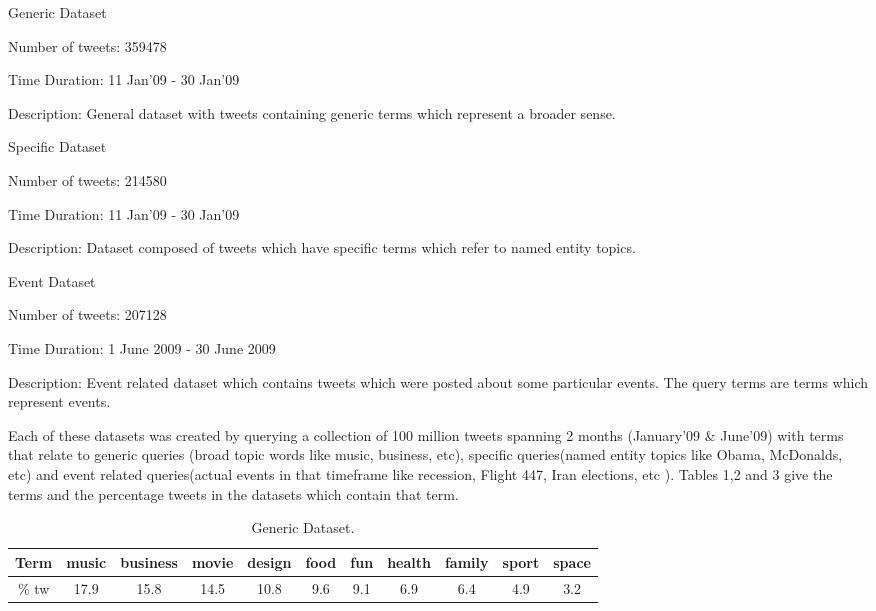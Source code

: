 \documentclass[10pt,a5paper,twoside]{article}
\begin{document}
\begin{compactenum}

\item Generic Dataset
\begin{compactitem}
\item Number of tweets: 359478
\item Time Duration: 11 Jan'09 - 30 Jan'09
\item Description: General dataset with tweets containing generic terms which represent a broader sense.
\end{compactitem}

\item Specific Dataset
\begin{compactitem}
\item Number of tweets: 214580
\item Time Duration: 11 Jan'09 - 30 Jan'09
\item Description: Dataset composed of tweets which have specific terms which refer to named entity topics.
\end{compactitem}

\item Event Dataset
\begin{compactitem}
\item Number of tweets: 207128
\item Time Duration: 1 June 2009 - 30 June 2009
\item Description: Event related dataset which contains tweets which were posted about some particular events. The query terms are terms which represent events.
\end{compactitem}

\end{compactenum}
Each of these datasets was created by querying a collection of 100 million tweets spanning 2 months (January'09 \& June'09) with terms that relate to generic queries (broad topic words like music, business, etc), specific queries(named entity topics like Obama, McDonalds, etc) and event related queries(actual events in that timeframe like recession, Flight 447, Iran elections, etc ). Tables 1,2 and 3 give the terms and the percentage tweets in the datasets which contain that term.
\\


\begin{table}[!h]
\setcounter{table}{0}
\centering

\resizebox{14cm}{!} 
{
	\begin{tabular}{|c|c|c|c|c|c|c|c|c|c|c|}
	\hline
	Term & music & business & movie & design & food & fun & health & family & sport & space\\
	\hline
	\% tw & 17.9 & 15.8 & 14.5 & 10.8 & 9.6 & 9.1 & 6.9 & 6.4 & 4.9 & 3.2 \\
	\hline
	\end{tabular}
}
\caption{Generic Dataset.}\label{Dataset}
\end{table}
\end{document}
